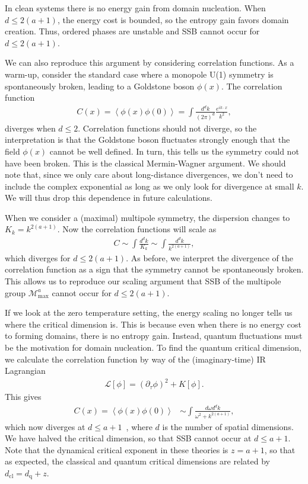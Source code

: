 \documentclass[pra,aps,twocolumn, amsfonts,amsmath,amssymb,nofootinbib,superscriptaddress]{revtex4-2}
\renewcommand{\max}{\text{max}}
\begin{document}
In clean systems there is no energy gain from domain nucleation. When $d\le2(a+1)$, the energy cost is bounded, so the entropy gain favors domain creation. Thus, ordered phases are unstable and SSB cannot occur for $d\le2(a+1)$.

We can also reproduce this argument by considering correlation functions. As a warm-up, consider the standard case where a monopole U(1) symmetry is spontaneously broken, leading to a Goldstone boson $\phi(x)$. The correlation function
\begin{align}
C(x) = \left\langle \phi(x) \phi(0) \right\rangle = \int \frac{d^dk}{(2\pi)^d} \frac{e^{i k \cdot x}}{k^2}, 
\end{align}
diverges when $d\le 2$. Correlation functions should not diverge, so the interpretation is that the Goldstone boson fluctuates strongly enough that the field $\phi(x)$ cannot be well defined. In turn, this tells us the symmetry could not have been broken. This is the classical Mermin-Wagner argument. We should note that, since we only care about long-distance divergences, we don't need to include the complex exponential as long as we only look for divergence at small $k$. We will thus drop this dependence in future calculations. 

When we consider a (maximal) multipole symmetry, the dispersion changes to $K_k=k^{2(a+1)}$. Now the correlation functions will scale as 
\begin{align}
C \sim \int \frac{d^dk}{K_k} \sim \int \frac{d^dk}{k^{2(a+1)}}, \label{eqn:correl}
\end{align}
which diverges for $d\le2(a+1)$. As before, we interpret the divergence of the correlation function as a sign that the symmetry cannot be spontaneously broken. This allows us to reproduce our scaling argument that SSB of the multipole group $\mathcal{M}^a_\max$ cannot occur for $d\le2(a+1)$.

If we look at the zero temperature setting, the energy scaling no longer tells us where the critical dimension is. This is because even when there is no energy cost to forming domains, there is no entropy gain. Instead, quantum fluctuations must be the motivation for domain nucleation. To find the quantum critical dimension, we calculate the correlation function by way of the (imaginary-time) IR Lagrangian 
\begin{align}
     \mathcal{L}[\phi] = (\partial_\tau\phi)^2 + K[\phi].
\end{align} 
This gives 
\begin{align}
\label{tzerocorr}C(x) = \left\langle \phi(x) \phi(0) \right\rangle &\sim \int \frac{d\omega d^dk}{\omega^2 + k^{2( a + 1 )}},
\end{align}
which now diverges at $d\le a+1$~\cite{Griffin2015}, where $d$ is the number of spatial dimensions. We have halved the critical dimension, so that SSB cannot occur at $d\le a+1$. Note that the dynamical critical exponent in these theories is $z = a+1$, so that as expected, the classical and quantum critical dimensions are related by $d_\text{cl} = d_\text{q} + z$.
\end{document}

